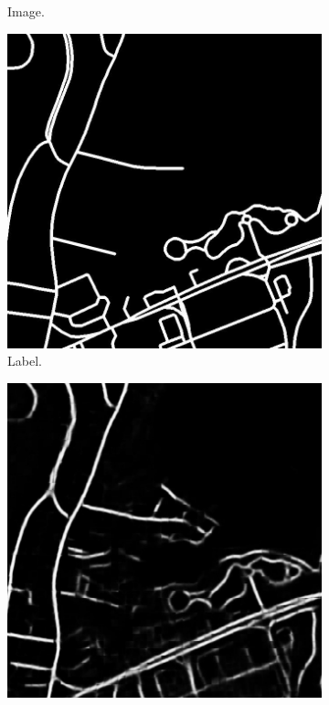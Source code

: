 \begin{figure}[H]
\begin{subfigure}{0.23\textwidth}
\caption{ Image.}
\vspace{0.2cm} %
\end{subfigure}
\hspace*{\fill} %
\begin{subfigure}{0.23\textwidth}
\includegraphics[width=\textwidth]{figs/appendix/label24628885_15.jpg}
\caption{Label.}
\vspace{0.2cm} %
\end{subfigure}
\hspace*{\fill} %
\begin{subfigure}{0.23\textwidth}
\includegraphics[width=\textwidth]{figs/appendix/pred24628885_15.jpg}

\end{subfigure}
\end{figure}
